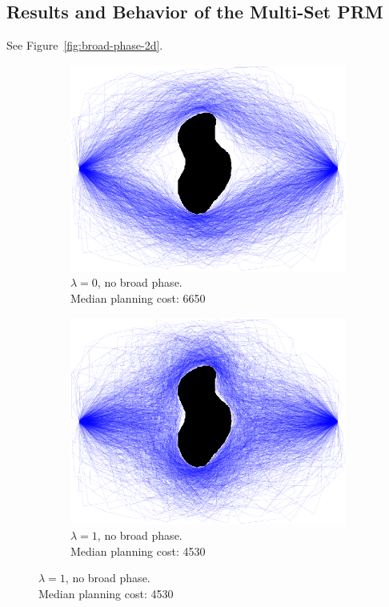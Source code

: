\subsection{Results and Behavior of the Multi-Set PRM}

See Figure~\ref{fig:broad-phase-2d}.

\begin{figure}
\centering

\begin{subfigure}[t]{0.45\linewidth}
\centering
\includegraphics[width=\columnwidth]{figs/paths-lambda0-norel.png}
\caption{
  $\lambda=0$, no broad phase.\\
  Median planning cost: 6650}
\end{subfigure}
\begin{subfigure}[t]{0.45\linewidth}
\centering
\includegraphics[width=\columnwidth]{figs/paths-lambda1-norel.png}
\caption{
  $\lambda=1$, no broad phase.\\
  Median planning cost: 4530}
\end{subfigure}


\end{figure}
